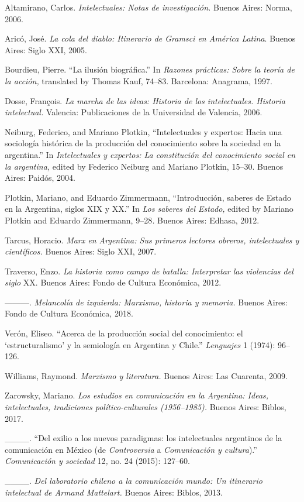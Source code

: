 \documentclass{tufte-handout}
\begin{document}
\begin{hangparas}{.25in}{1} 



Altamirano, Carlos. \emph{Intelectuales: Notas de investigación.} Buenos
Aires: Norma, 2006.

Aricó, José. \emph{La cola del diablo: Itinerario de Gramsci en América
Latina}. Buenos Aires: Siglo XXI, 2005.

Bourdieu, Pierre. ``La ilusión biográfica.'' In \emph{Razones prácticas:
Sobre la teoría de la acción,} translated by Thomas Kauf, 74--83.
Barcelona: Anagrama, 1997.

Dosse, François. \emph{La marcha de las ideas: Historia de los
intelectuales. Historia intelectual.} Valencia: Publicaciones de la
Universidad de Valencia, 2006.

Neiburg, Federico, and Mariano Plotkin, ``Intelectuales y expertos:
Hacia una sociología histórica de la producción del conocimiento sobre
la sociedad en la argentina.'' In \emph{Intelectuales y expertos: La
constitución del conocimiento social en la argentina,} edited by
Federico Neiburg and Mariano Plotkin, 15--30. Buenos Aires: Paidós,
2004.

Plotkin, Mariano, and Eduardo Zimmermann, ``Introducción, saberes de
Estado en la Argentina, siglos XIX y XX.'' In \emph{Los saberes del
Estado,} edited by Mariano Plotkin and Eduardo Zimmermann, 9--28\emph{.}
Buenos Aires: Edhasa, 2012.

Tarcus, Horacio. \emph{Marx en Argentina: Sus primeros lectores obreros,
intelectuales y científicos.} Buenos Aires: Siglo XXI, 2007.

Traverso, Enzo. \emph{La historia como campo de batalla: Interpretar las
violencias del siglo} XX. Buenos Aires: Fondo de Cultura Económica,
2012.

---------. \emph{Melancolía de izquierda: Marxismo, historia y memoria.}
Buenos Aires: Fondo de Cultura Económica, 2018.

Verón, Eliseo. ``Acerca de la producción social del conocimiento: el
`estructuralismo' y la semiología en Argentina y Chile.''
\emph{Lenguajes} 1 (1974): 96--126.

Williams, Raymond. \emph{Marxismo y literatura.} Buenos Aires: Las
Cuarenta, 2009.

Zarowsky, Mariano. \emph{Los estudios en comunicación en la Argentina:
Ideas, intelectuales, tradiciones político-culturales (1956--1985).}
Buenos Aires: Biblos, 2017.

\_\_\_\_. ``Del exilio a los nuevos paradigmas: los intelectuales
argentinos de la comunicación en México (de \emph{Controversia} a
\emph{Comunicación y cultura}).'' \emph{Comunicación y sociedad}
12\emph{,} no. 24 (2015): 127--60.

\_\_\_\_. \emph{Del laboratorio chileno a la comunicación mundo: Un
itinerario intelectual de Armand Mattelart.} Buenos Aires: Biblos, 2013.



\end{hangparas}
\end{document}

